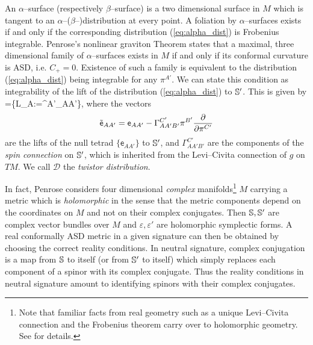 An $\alpha$--surface (respectively $\beta$--surface) is a two dimensional surface in $M$ which is tangent to an $\alpha$--($\beta$--)distribution at every point. A foliation by $\alpha$--surfaces exists if and only if the corresponding distribution (\ref{eq:alpha_dist}) is Frobenius integrable. Penrose's nonlinear graviton Theorem \cite{penrose} states that a 
maximal, three dimensional family of $\alpha$--surfaces exists in $M$ if and only if its conformal curvature is ASD, i.e. $C_+=0$. Existence of such a family is equivalent to the distribution (\ref{eq:alpha_dist}) being integrable for any $\pi^{A'}$. We can state this condition as integrability of the lift of the distribution (\ref{eq:alpha_dist}) to $\mathbb{S}'$. This is given by
\be \label{eq:twistor_dist}
=\{L_A:=\pi^{A'}_{AA'}\},
\ee
where the vectors
\[
\tilde{\mathsf{e}}_{AA'}=\mathsf{e}_{AA'} - \Gamma^{C'}_{AA'B'}\pi^{B'}\frac{\partial}{\partial\pi^{C'}}
\]
are the lifts of the null tetrad $\{\mathsf{e}_{AA'}\}$ to $\mathbb{S}'$, and $\Gamma^{C'}_{AA'B'}$ are the components of the \textit{spin connection} on $\mathbb{S}'$, which is inherited from the Levi--Civita connection of $g$ on $TM$. We call $\mathcal{D}$ the \textit{twistor distribution}.

In fact, Penrose considers four dimensional \textit{complex} manifolds\footnote{Note that familiar facts from real geometry such as a unique Levi--Civita connection and the Frobenius theorem carry over to holomorphic geometry. See \cite{LeBrun83} for details.} $M$ carrying a metric which is \textit{holomorphic} in the sense that the metric components depend on the coordinates on $M$ and not on their complex conjugates. Then $\mathbb{S},\mathbb{S}'$ are complex vector bundles over $M$ and $\varepsilon,\varepsilon'$ are holomorphic symplectic forms. A real conformally ASD metric in a given signature can then be obtained by choosing the correct reality conditions. In neutral signature, complex conjugation is a map from $\mathbb{S}$ to itself (or from $\mathbb{S}'$ to itself) which simply replaces each component of a spinor with its complex conjugate. Thus the reality conditions in neutral signature amount to identifying spinors with their complex conjugates.

